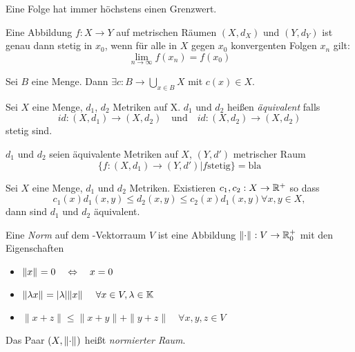 \documentclass{skript}
\begin{document}
\begin{stz}
    Eine Folge hat immer höchstens einen Grenzwert.
\end{stz}

\begin{stz}
    Eine Abbildung $f: X \to Y$ auf metrischen Räumen $(X, d_X)$ und $(Y, d_Y)$ ist
    genau dann stetig in $x_0$, wenn für alle in $X$ gegen $x_0$ konvergenten Folgen
    $x_n$ gilt: \[\lim_{n\to \infty} f(x_n) = f(x_0)\]
\end{stz}

\begin{axm}[Auswahlaxiom]
    Sei $B$ eine Menge. Dann $\exists c: B \to \bigcup_{x\in B} X$ mit $c(x)\in X$.   
\end{axm}

\begin{dfn}
    Sei $X$ eine Menge, $d_1$, $d_2$ Metriken auf X. $d_1$ und $d_2$ heißen
    \emph{äquivalent} falls
    \[id: (X, d_1) \to (X, d_2) \quad \mathrm{und}\quad id: (X, d_2) \to (X, d_2)\]
    stetig sind.

\begin{bem}
    $d_1$ und $d_2$ seien äquivalente Metriken auf $X$, $(Y, d')$ metrischer Raum
    \[\{f:(X, d_1) \to (Y, d') | f \mathrm{stetig} \} = \mathrm{bla}\]
\end{bem}
\end{dfn}

\begin{stz}
    Sei $X$ eine Menge, $d_1$ und $d_2$ Metriken. Existieren $c_1, c_2: X\to
    \mathbb{R}^+$ so dass
    \[c_1(x)d_1(x, y) \leq d_2(x,y) \leq c_2(x)d_1(x,y) \forall x,y \in X,\]
    dann sind $d_1$ und $d_2$ äquivalent.
\end{stz}

\begin{dfn}
    Eine \emph{Norm} auf dem -Vektorraum $V$ ist eine Abbildung
    $\norm{\cdot}: V \to \R^+_0$ mit den Eigenschaften
    \begin{itemize}
        \item $\norm{x} = 0 \quad \Equiv \quad x = 0$
        \item $\norm{\lambda x} = |\lambda| \norm{x} \
                    \quad \forall x \in V, \lambda \in \menge{K}$
        \item $\|x + z\| \leq \|x + y\| + \|y + z\| \quad \forall x,y,z \in V$
    \end{itemize}
    Das Paar $(X, \norm{\cdot})$ heißt \emph{normierter Raum}.
\end{dfn}
\end{document}
